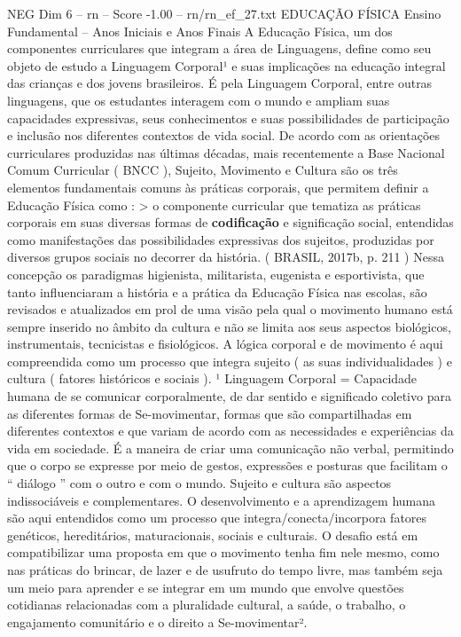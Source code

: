 \begin{textsample}{NEG Dim 6 – rn – Score -1.00 – rn/rn\_ef\_27.txt}  \label{ex:f6_neg_052}
EDUCAÇÃO FÍSICA Ensino Fundamental – Anos Iniciais e Anos Finais A Educação Física, um dos componentes curriculares que integram a área de Linguagens, define como seu objeto de estudo a Linguagem Corporal¹ e suas implicações na educação integral das crianças e dos jovens brasileiros.
É pela Linguagem Corporal, entre outras linguagens, que os estudantes interagem com o mundo e ampliam suas capacidades expressivas, seus conhecimentos e suas possibilidades de participação e inclusão nos diferentes contextos de vida social.
De acordo com as orientações curriculares produzidas nas últimas décadas, mais recentemente a Base Nacional Comum Curricular ( BNCC ), Sujeito, Movimento e Cultura são os três elementos fundamentais comuns às práticas corporais, que permitem definir a Educação Física como : > o componente curricular que tematiza as práticas corporais em suas diversas formas de \textbf{codificação} e significação social, entendidas como manifestações das possibilidades expressivas dos sujeitos, produzidas por diversos grupos sociais no decorrer da história. ( BRASIL, 2017b, p. 211 ) Nessa concepção os paradigmas higienista, militarista, eugenista e esportivista, que tanto influenciaram a história e a prática da Educação Física nas escolas, são revisados e atualizados em prol de uma visão pela qual o movimento humano está sempre inserido no âmbito da cultura e não se limita aos seus aspectos biológicos, instrumentais, tecnicistas e fisiológicos.
A lógica corporal e de movimento é aqui compreendida como um processo que integra sujeito ( as suas individualidades ) e cultura ( fatores históricos e sociais ). ¹ Linguagem Corporal = Capacidade humana de se comunicar corporalmente, de dar sentido e significado coletivo para as diferentes formas de Se-movimentar, formas que são compartilhadas em diferentes contextos e que variam de acordo com as necessidades e experiências da vida em sociedade.
É a maneira de criar uma comunicação não verbal, permitindo que o corpo se expresse por meio de gestos, expressões e posturas que facilitam o “ diálogo ” com o outro e com o mundo.
Sujeito e cultura são aspectos indissociáveis e complementares.
O desenvolvimento e a aprendizagem humana são aqui entendidos como um processo que integra/conecta/incorpora fatores genéticos, hereditários, maturacionais, sociais e culturais.
O desafio está em compatibilizar uma proposta em que o movimento tenha fim nele mesmo, como nas práticas do brincar, de lazer e de usufruto do tempo livre, mas também seja um meio para aprender e se integrar em um mundo que envolve questões cotidianas relacionadas com a pluralidade cultural, a saúde, o trabalho, o engajamento comunitário e o direito a Se-movimentar².

\end{textsample}
